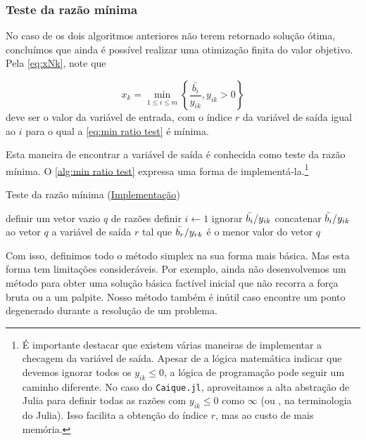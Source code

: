 \subsubsection*{Teste da razão mínima}
No caso de os dois algoritmos anteriores não terem retornado solução ótima, concluímos que ainda é possível realizar uma otimização finita do valor objetivo. Pela \cref{eq:xNk}, note que

\begin{equation}\label{eq:min ratio test}
     x_k = \min_{1\leq i \leq m}\left\{\frac{\bar{ b_i}}{y_{ik}}, y_{ik} > 0 \right\}
\end{equation}
deve ser o valor da variável de entrada, com o índice $r$ da variável de saída igual ao $i$ para o qual a \cref{eq:min ratio test} é mínima.

Esta maneira de encontrar a variável de saída é conhecida como teste da razão mínima. O \cref{alg:min ratio test} expressa uma forma de implementá-la.\footnote{É importante destacar que existem várias maneiras de implementar a checagem da variável de saída. Apesar de a lógica matemática indicar que devemos ignorar todos os $y_{ik} \leq 0$, a lógica de programação pode seguir um caminho diferente. No caso do \texttt{Caique.jl}, aproveitamos a alta abstração de Julia para definir todas as razões com $y_{ik} \leq 0$ como $\infty$ (ou , na terminologia do Julia). Isso facilita a obtenção do índice $r$, mas ao custo de mais memória.}

\begin{algorithm}[t]
\begin{algorithmic}[1]
    \caption{Teste da razão mínima (\href{https://github.com/phcentenaro7/Caique.jl/blob/9c78027f1884181846a6321a5640f92c9a718ce4/src/Simplex.jl\#L153}{Implementação})}\label{alg:min ratio test}
    \State definir um vetor vazio $ q$ de razões
    \State definir $i \gets 1$
            \State ignorar $\bar{ b_i}/y_{ik}$
        \Else
            \State concatenar $\bar{ b_i}/y_{ik}$ ao vetor $ q$
        \EndIf
    \EndWhile
    \State \Return a variável de saída $r$ tal que $\bar{b_r}/y_{rk}$ é o menor valor do vetor $ q$
\end{algorithmic}
\end{algorithm}

Com isso, definimos todo o método simplex na sua forma mais básica. Mas esta forma tem limitações consideráveis. Por exemplo, ainda não desenvolvemos um método para obter uma solução básica factível inicial que não recorra a força bruta ou a um palpite. Nosso método também é inútil caso encontre um ponto degenerado durante a resolução de um problema.

